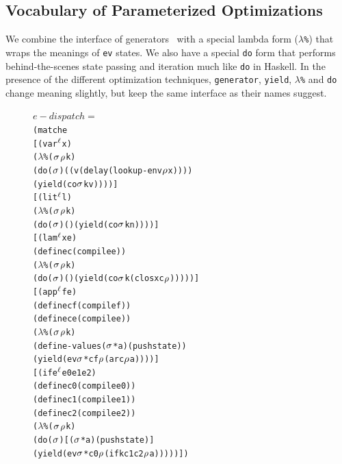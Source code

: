 \documentclass[preprint,onecolumn,9pt]{sigplanconf} %
\begin{document}
\subsection{Vocabulary of Parameterized Optimizations}

We combine the interface of generators~\cite{ianjohnson:cluhistory}
with a special lambda form ({\tt $\lambda$\%}) that wraps the meanings
of {\tt ev} states. We also have a special {\tt do} form that performs
behind-the-scenes state passing and iteration much like {\tt do} in
Haskell. In the presence of the different optimization
techniques, {\tt generator}, {\tt yield}, {\tt $\lambda$\%} and {\tt do}
change meaning slightly, but keep the same interface as their names
suggest.

\begin{figure}
\begin{alltt}
\(e-dispatch =\)
(match e
  [(var\(\superscript\mlab\) x)
   (\(\lambda\)\% (\(\msto\) \(\menv\) k)
    (do (\(\msto\)) ((v (delay (lookup-env \(\menv\) x))))
      (yield (co \(\msto\) k v))))]
  [(lit\(\superscript\mlab\) l)
   (\(\lambda\)\% (\(\msto\) \(\menv\) k)
    (do (\(\msto\)) () (yield (co \(\msto\) k n))))]
  [(lam\(\superscript\mlab\) x e)
   (define c (compile e))
   (\(\lambda\)\% (\(\msto\) \(\menv\) k)
    (do (\(\msto\)) () (yield (co \(\msto\) k (clos x c \(\menv\))))))]
  [(app\(\superscript\mlab\) f e)
   (define cf (compile f))
   (define ce (compile e))
   (\(\lambda\)\% (\(\msto\) \(\menv\) k)
    (define-values (\(\msto\)* a) (push state))
    (yield (ev \(\msto\)* cf \(\menv\) (ar c \(\menv\) a))))]
  [(ife\(\superscript\mlab\) e0 e1 e2)
   (define c0 (compile e0))
   (define c1 (compile e1))
   (define c2 (compile e2))
   (\(\lambda\)\% (\(\msto\) \(\menv\) k)
     (do (\(\msto\)) [(\(\msto\)* a) (push state)]
      (yield (ev \(\msto\)* c0 \(\menv\) (ifk c1 c2 \(\menv\) a)))))])


\end{alltt}
\end{figure}
\end{document}
